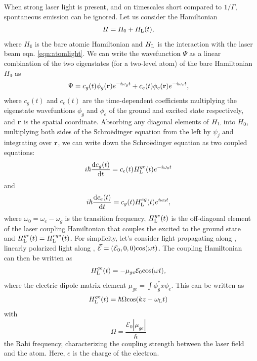 When strong laser light is present, and on timescales short compared to $1/\Gamma$, spontaneous emission can be ignored\cite{LCT}.  Let us consider the Hamiltonian 
\begin{equation}
H=H_0 + H_{\rm L}(t),
\end{equation}
where $H_0$ is the bare atomic Hamiltonian and $H_{\rm L}$ is the interaction with the laser beam eqn. \ref{eqn:atomlight}. We can write the wavefunction $\Psi$ as a linear combination of the two eigenstates (for a two-level atom) of the bare Hamiltonian $H_0$ as 
\begin{equation}
\Psi = c_g(t)\phi_g ({\bf r})e^{-i\omega_g t} + c_e(t)\phi_e ({\bf r})e^{-i\omega_e t},
\end{equation}
where $c_g(t)$ and $c_e(t)$ are the time-dependent coefficients multiplying the eigenstate wavefuntions $\phi_g$ and $\phi_e$ of the ground and excited state respectively, and ${\bf r}$ is the spatial coordinate. Absorbing any diagonal elements of $H_{\rm L}$ into $H_0$, multiplying both sides of the Schro\"edinger equation from the left by $\psi_j$ and integrating over ${\bf r}$, we can write down the Schro\"edinger equation as two coupled equations:
\begin{equation}
i\hbar\frac{{\rm d}c_g(t)}{{\rm d}t} = c_e(t) H_{\rm L}^{ge}(t)e^{-i\omega_0t}
\end{equation}
and 
\begin{equation}
i\hbar\frac{{\rm d}c_e(t)}{{\rm d}t} = c_g(t) H_{\rm L}^{eg}(t)e^{i\omega_0t},
\end{equation}
where $\omega_0 = \omega_e - \omega_g$ is the transition frequency, $ H_{\rm L}^{ge}(t)$ is the off-diagonal element of the laser coupling Hamiltonian that couples the excited to the ground state and  $H_{\rm L}^{ge}(t)= H_{\rm L}^{eg*}(t)$. For simplicity, let's consider light propagating along \ez{}, linearly polarized light along \ex{}, $\vec{\mathcal{E}} = (\mathcal{E}_0,0,0){\rm cos}(\omega t)$. The coupling Hamiltonian can then be written as\cite{Fox}
\begin{equation}
 H_{\rm L}^{ge}(t) = -\mu_{ge}\mathcal{E}_0{\rm cos}(\omega t),
\end{equation}
where the electric dipole matrix element $\mu_{ge}=\int \phi_g^* x \phi_e$. This can be written as
\begin{equation}
 H_{\rm L}^{ge}(t) = \hbar \Omega {\rm cos}(kz - \omega_{\rm L} t)
\end{equation}
with
\begin{equation}
\Omega = \frac{\mathcal{E}_0|\mu_{ge}|}{\hbar}
\end{equation}
the Rabi frequency, characterizing the coupling strength between the laser field and the atom. Here, $e$ is the charge of the electron. 

